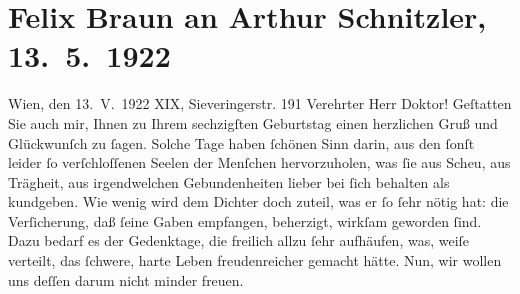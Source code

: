 

         \renewcommand{\erwaehnteOrte}{Orte: Sieveringer Straße, Wien}
         \renewcommand{\erwaehnteWerke}{}
               \section[Felix Braun an Arthur Schnitzler, 13. 5. 1922]{ Felix Braun an Arthur Schnitzler, 13. 5. 1922}\nopagebreak{}\rehead{ }\begin{ledgroupsized}[t]{13cm}\normalsize\beginnumbering \toendnotes[C]{\smallbreak\pagebreak[2]} 
\toendnotes[C]{\smallbreak}\pstart
           \raggedleft{}{\pb}Wien, den 13. V. 1922\pend
           \pstart
           \raggedleft{}XIX, Sieveringerstr. 191\pend
           \pstart{}Verehrter Herr Doktor!\pend\pstart
           Geſtatten Sie auch mir, Ihnen zu Ihrem sechzigſten Geburtstag einen herzlichen Gruß
               und Glückwunſch zu ſagen. Solche Tage haben \label{T_L02381-1v}\label{T_L02381-1h} ſchönen Sinn darin, aus den ſonſt
               leider ſo verſchloſſenen Seelen der Menſchen hervorzuholen, was ſie aus Scheu, aus
               Trägheit, aus irgendwelchen Gebundenheiten lieber bei ſich behalten als kundgeben.
               Wie wenig wird dem Dichter doch zuteil, was er ſo ſehr nötig hat: die Verſicherung,
               daß ſeine Gaben empfangen, beherzigt, wirkſam geworden ſind. Dazu bedarf es der
               Gedenktage, die freilich allzu ſehr aufhäufen, was, weiſe verteilt, das ſchwere,
               harte Leben freudenreicher gemacht hätte. Nun, wir wollen uns deſſen darum nicht
               minder freuen.\pend

\end{ledgroupsized}
